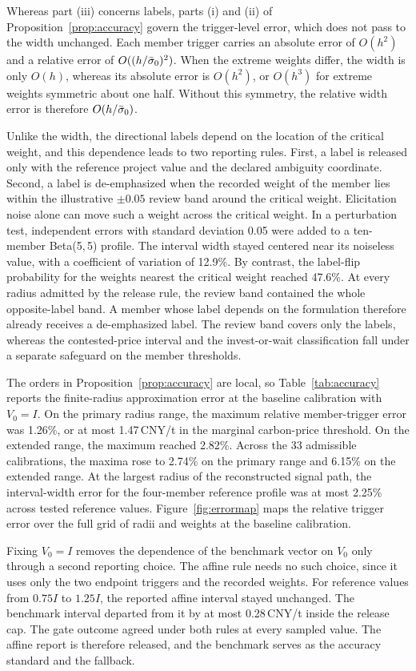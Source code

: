 Whereas part (iii) concerns labels, parts (i) and (ii) of Proposition~\ref{prop:accuracy} govern the trigger-level error, which does not pass to the width unchanged. Each member trigger carries an absolute error of $O(h^{2})$ and a relative error of $O((h/\bar{\sigma}_0)^{2})$. When the extreme weights differ, the width is only $O(h)$, whereas its absolute error is $O(h^{2})$, or $O(h^{3})$ for extreme weights symmetric about one half. Without this symmetry, the relative width error is therefore $O(h/\bar{\sigma}_0)$.

Unlike the width, the directional labels depend on the location of the critical weight, and this dependence leads to two reporting rules. First, a label is released only with the reference project value and the declared ambiguity coordinate. Second, a label is de-emphasized when the recorded weight of the member lies within the illustrative $\pm0.05$ review band around the critical weight. Elicitation noise alone can move such a weight across the critical weight. In a perturbation test, independent errors with standard deviation 0.05 were added to a ten-member Beta(5,\,5) profile. The interval width stayed centered near its noiseless value, with a coefficient of variation of 12.9\%. By contrast, the label-flip probability for the weights nearest the critical weight reached 47.6\%. At every radius admitted by the release rule, the review band contained the whole opposite-label band. A member whose label depends on the formulation therefore already receives a de-emphasized label. The review band covers only the labels, whereas the contested-price interval and the invest-or-wait classification fall under a separate safeguard on the member thresholds.

The orders in Proposition~\ref{prop:accuracy} are local, so Table~\ref{tab:accuracy} reports the finite-radius approximation error at the baseline calibration with $V_0=I$. On the primary radius range, the maximum relative member-trigger error was 1.26\%, or at most 1.47\,CNY/t in the marginal carbon-price threshold. On the extended range, the maximum reached 2.82\%. Across the 33 admissible calibrations, the maxima rose to 2.74\% on the primary range and 6.15\% on the extended range. At the largest radius of the reconstructed signal path, the interval-width error for the four-member reference profile was at most 2.25\% across tested reference values. Figure~\ref{fig:errormap} maps the relative trigger error over the full grid of radii and weights at the baseline calibration.

Fixing $V_0=I$ removes the dependence of the benchmark vector on $V_0$ only through a second reporting choice. The affine rule needs no such choice, since it uses only the two endpoint triggers and the recorded weights. For reference values from $0.75I$ to $1.25I$, the reported affine interval stayed unchanged. The benchmark interval departed from it by at most 0.28\,CNY/t inside the release cap. The gate outcome agreed under both rules at every sampled value. The affine report is therefore released, and the benchmark serves as the accuracy standard and the fallback.

